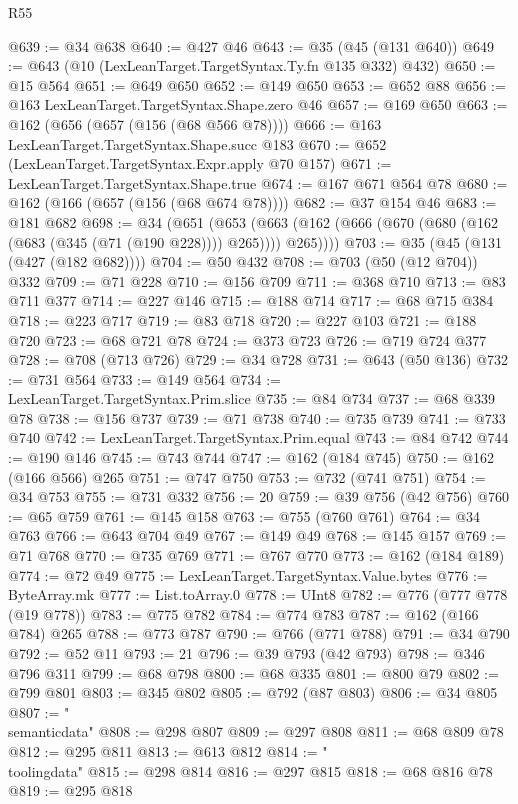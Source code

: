 \begin{lexlean}{R55}
\begin{coremodule}
{{@639 := @34 @638
@640 := @427 @46
@643 := @35 (@45 (@131 @640))
@649 := @643 (@10 (LexLeanTarget.TargetSyntax.Ty.fn @135 @332) @432)
@650 := @15 @564
@651 := @649 @650
@652 := @149 @650
@653 := @652 @88
@656 := @163 LexLeanTarget.TargetSyntax.Shape.zero @46
@657 := @169 @650
@663 := @162 (@656 (@657 (@156 (@68 @566 @78))))
@666 := @163 LexLeanTarget.TargetSyntax.Shape.succ @183
@670 := @652 (LexLeanTarget.TargetSyntax.Expr.apply @70 @157)
@671 := LexLeanTarget.TargetSyntax.Shape.true
@674 := @167 @671 @564 @78
@680 := @162 (@166 (@657 (@156 (@68 @674 @78))))
@682 := @37 @154 @46
@683 := @181 @682
@698 := @34
    (@651
      (@653 (@663 (@162 (@666 (@670 (@680 (@162 (@683 (@345 (@71 (@190 @228)))) @265)))) @265))))
@703 := @35 (@45 (@131 (@427 (@182 @682))))
@704 := @50 @432
@708 := @703 (@50 (@12 @704)) @332
@709 := @71 @228
@710 := @156 @709
@711 := @368 @710
@713 := @83 @711 @377
@714 := @227 @146
@715 := @188 @714
@717 := @68 @715 @384
@718 := @223 @717
@719 := @83 @718
@720 := @227 @103
@721 := @188 @720
@723 := @68 @721 @78
@724 := @373 @723
@726 := @719 @724 @377
@728 := @708 (@713 @726)
@729 := @34 @728
@731 := @643 (@50 @136)
@732 := @731 @564
@733 := @149 @564
@734 := LexLeanTarget.TargetSyntax.Prim.slice
@735 := @84 @734
@737 := @68 @339 @78
@738 := @156 @737
@739 := @71 @738
@740 := @735 @739
@741 := @733 @740
@742 := LexLeanTarget.TargetSyntax.Prim.equal
@743 := @84 @742
@744 := @190 @146
@745 := @743 @744
@747 := @162 (@184 @745)
@750 := @162 (@166 @566) @265
@751 := @747 @750
@753 := @732 (@741 @751)
@754 := @34 @753
@755 := @731 @332
@756 := 20
@759 := @39 @756 (@42 @756)
@760 := @65 @759
@761 := @145 @158
@763 := @755 (@760 @761)
@764 := @34 @763
@766 := @643 @704 @49
@767 := @149 @49
@768 := @145 @157
@769 := @71 @768
@770 := @735 @769
@771 := @767 @770
@773 := @162 (@184 @189)
@774 := @72 @49
@775 := LexLeanTarget.TargetSyntax.Value.bytes
@776 := ByteArray.mk
@777 := List.toArray.{0}
@778 := UInt8
@782 := @776 (@777 @778 (@19 @778))
@783 := @775 @782
@784 := @774 @783
@787 := @162 (@166 @784) @265
@788 := @773 @787
@790 := @766 (@771 @788)
@791 := @34 @790
@792 := @52 @11
@793 := 21
@796 := @39 @793 (@42 @793)
@798 := @346 @796 @311
@799 := @68 @798
@800 := @68 @335
@801 := @800 @79
@802 := @799 @801
@803 := @345 @802
@805 := @792 (@87 @803)
@806 := @34 @805
@807 := "\\semanticdata"
@808 := @298 @807
@809 := @297 @808
@811 := @68 @809 @78
@812 := @295 @811
@813 := @613 @812
@814 := "\\toolingdata"
@815 := @298 @814
@816 := @297 @815
@818 := @68 @816 @78
@819 := @295 @818
}}
\end{coremodule}
\end{lexlean}
